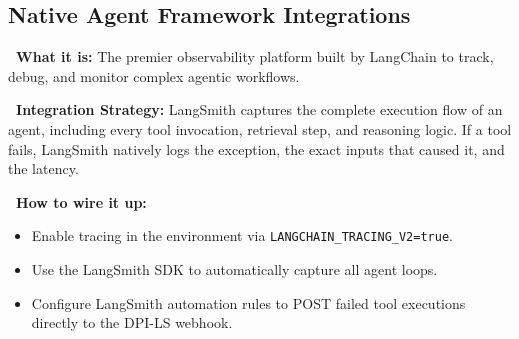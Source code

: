 \documentclass[11pt,a4paper]{article}
\begin{document}
\begin{center}
{
}
\end{center}
\vspace{0.5cm}

\subsection{Native Agent Framework Integrations}

\begin{tcolorbox}[enhanced, colback=gray!5!white, colframe=gray, title={\textbf{\faCode\ LangSmith}}, fonttitle=\bfseries, boxrule=1pt, arc=2mm]
\textbf{\color{dpiblue}\faQuestionCircle\ What it is:} The premier observability platform built by LangChain to track, debug, and monitor complex agentic workflows.

\vspace{0.2cm}
\textbf{\color{dpigreen}\faCogs\ Integration Strategy:} LangSmith captures the complete execution flow of an agent, including every tool invocation, retrieval step, and reasoning logic. If a tool fails, LangSmith natively logs the exception, the exact inputs that caused it, and the latency.

\vspace{0.2cm}
\textbf{\color{dpicloud}\faPlug\ How to wire it up:}
\begin{itemize}
    \item \textbf{\color{gray}\faTerminal} Enable tracing in the environment via \texttt{LANGCHAIN\_TRACING\_V2=true}.
    \item \textbf{\color{gray}\faProjectDiagram} Use the LangSmith SDK to automatically capture all agent loops.
    \item \textbf{\color{gray}\faShareSquare} Configure LangSmith automation rules to POST failed tool executions directly to the DPI-LS webhook.
\end{itemize}
\end{tcolorbox}

\vspace{0.3cm}
\end{document}
